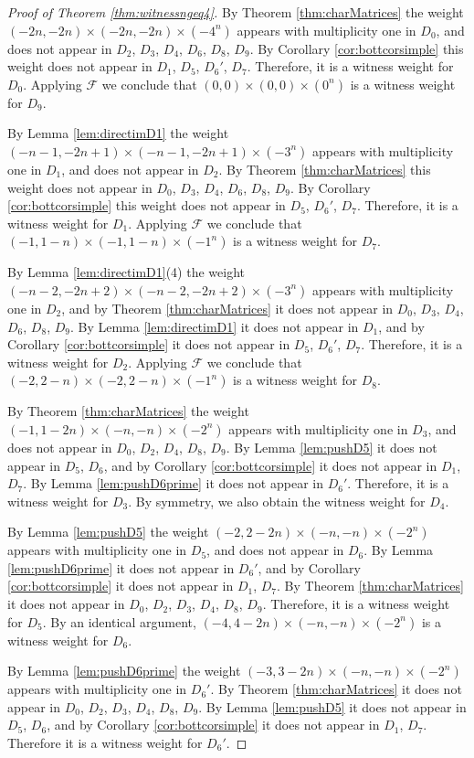 \documentclass[11pt,reqno]{amsart}
\newcommand{\mc}[1]{\mathcal{#1}}
\numberwithin{equation}{section}
\begin{document}
\begin{proof}[Proof of Theorem \ref{thm:witnessngeq4}]
By Theorem \ref{thm:charMatrices} the weight $(-2n,-2n)\times (-2n,-2n)\times (-4^n)$ appears with multiplicity one in $D_0$, and does not appear in $D_2$, $D_3$, $D_4$, $D_6$, $D_8$, $D_9$.	By Corollary \ref{cor:bottcorsimple} this weight does not appear in $D_1$, $D_5$, $D_6'$, $D_7$. Therefore, it is a witness weight for $D_0$. Applying $\mc{F}$ we conclude that $(0,0)\times (0,0)\times (0^n)$ is a witness weight for $D_9$.

By Lemma \ref{lem:directimD1} the weight $(-n-1,-2n+1)\times (-n-1,-2n+1)\times (-3^n)$ appears with multiplicity one in $D_1$, and does not appear in $D_2$. By Theorem \ref{thm:charMatrices} this weight does not appear in $D_0$, $D_3$, $D_4$, $D_6$, $D_8$, $D_9$. By Corollary \ref{cor:bottcorsimple} this weight does not appear in $D_5$, $D_6'$, $D_7$. Therefore, it is a witness weight for $D_1$. Applying $\mc{F}$ we conclude that $(-1,1-n)\times (-1,1-n)\times (-1^n)$ is a witness weight for $D_7$.

By Lemma \ref{lem:directimD1}(4) the weight $(-n-2,-2n+2)\times (-n-2,-2n+2)\times (-3^n)$ appears with multiplicity one in $D_2$, and by Theorem \ref{thm:charMatrices} it does not appear in $D_0$, $D_3$, $D_4$, $D_6$, $D_8$, $D_9$. By Lemma \ref{lem:directimD1} it does not appear in $D_1$, and by Corollary \ref{cor:bottcorsimple} it does not appear in $D_5$, $D_6'$, $D_7$. Therefore, it is a witness weight for $D_2$. Applying $\mc{F}$ we conclude that $(-2,2-n)\times (-2,2-n)\times (-1^n)$ is a witness weight for $D_8$.

By Theorem \ref{thm:charMatrices} the weight $(-1,1-2n)\times (-n,-n)\times (-2^n)$ appears with multiplicity one in $D_3$, and does not appear in $D_0$, $D_2$, $D_4$, $D_8$, $D_9$. By Lemma \ref{lem:pushD5} it does not appear in $D_5$, $D_6$, and by Corollary \ref{cor:bottcorsimple} it does not appear in $D_1$, $D_7$. By Lemma \ref{lem:pushD6prime} it does not appear in $D_6'$. Therefore, it is a witness weight for $D_3$. By symmetry, we also obtain the witness weight for $D_4$.

By Lemma \ref{lem:pushD5} the weight $(-2,2-2n)\times (-n,-n) \times (-2^n)$ appears with multiplicity one in $D_5$, and does not appear in $D_6$. By Lemma \ref{lem:pushD6prime} it does not appear in $D_6'$, and by Corollary \ref{cor:bottcorsimple} it does not appear in $D_1$, $D_7$. By Theorem \ref{thm:charMatrices} it does not appear in $D_0$, $D_2$, $D_3$, $D_4$, $D_8$, $D_9$. Therefore, it is a witness weight for $D_5$. By an identical argument, $(-4,4-2n)\times (-n,-n)\times (-2^n)$ is a witness weight for $D_6$.

By Lemma \ref{lem:pushD6prime} the weight $(-3,3-2n)\times (-n,-n)\times (-2^n)$ appears with multiplicity one in $D_6'$. By Theorem \ref{thm:charMatrices} it does not appear in $D_0$, $D_2$, $D_3$, $D_4$, $D_8$, $D_9$. By Lemma \ref{lem:pushD5} it does not appear in $D_5$, $D_6$, and by Corollary \ref{cor:bottcorsimple} it does not appear in $D_1$, $D_7$. Therefore it is a witness weight for $D_6'$.
\end{proof}
\end{document}
